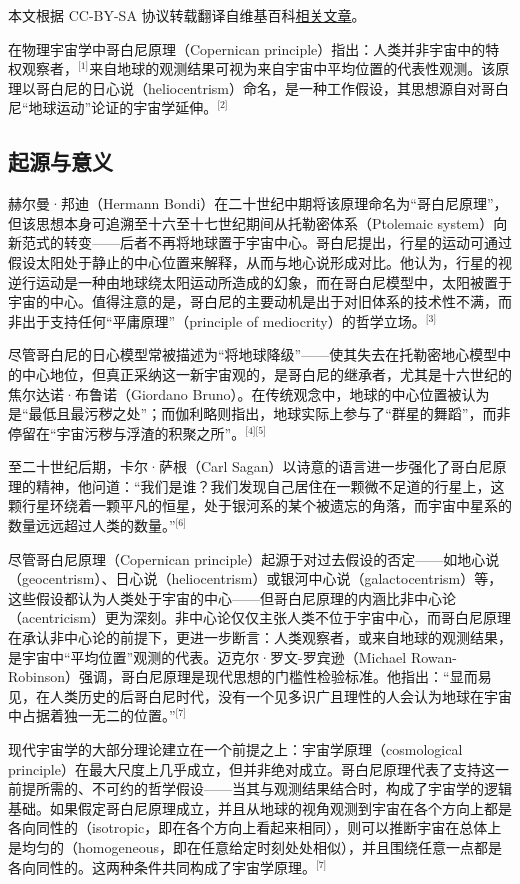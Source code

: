 
本文根据 CC-BY-SA 协议转载翻译自维基百科\href{https://en.wikipedia.org/wiki/Copernican_principle}{相关文章}。

在物理宇宙学中哥白尼原理（Copernican principle）指出：人类并非宇宙中的特权观察者，\(^\text{[1]}\)来自地球的观测结果可视为来自宇宙中平均位置的代表性观测。该原理以哥白尼的日心说（heliocentrism）命名，是一种工作假设，其思想源自对哥白尼“地球运动”论证的宇宙学延伸。\(^\text{[2]}\)
\subsection{起源与意义}
赫尔曼·邦迪（Hermann Bondi）在二十世纪中期将该原理命名为“哥白尼原理”，但该思想本身可追溯至十六至十七世纪期间从托勒密体系（Ptolemaic system）向新范式的转变——后者不再将地球置于宇宙中心。哥白尼提出，行星的运动可通过假设太阳处于静止的中心位置来解释，从而与地心说形成对比。他认为，行星的视逆行运动是一种由地球绕太阳运动所造成的幻象，而在哥白尼模型中，太阳被置于宇宙的中心。值得注意的是，哥白尼的主要动机是出于对旧体系的技术性不满，而非出于支持任何“平庸原理”（principle of mediocrity）的哲学立场。\(^\text{[3]}\)

尽管哥白尼的日心模型常被描述为“将地球降级”——使其失去在托勒密地心模型中的中心地位，但真正采纳这一新宇宙观的，是哥白尼的继承者，尤其是十六世纪的焦尔达诺·布鲁诺（Giordano Bruno）。在传统观念中，地球的中心位置被认为是“最低且最污秽之处”；而伽利略则指出，地球实际上参与了“群星的舞蹈”，而非停留在“宇宙污秽与浮渣的积聚之所”。\(^\text{[4][5]}\)

至二十世纪后期，卡尔·萨根（Carl Sagan）以诗意的语言进一步强化了哥白尼原理的精神，他问道：“我们是谁？我们发现自己居住在一颗微不足道的行星上，这颗行星环绕着一颗平凡的恒星，处于银河系的某个被遗忘的角落，而宇宙中星系的数量远远超过人类的数量。”\(^\text{[6]}\)

尽管哥白尼原理（Copernican principle）起源于对过去假设的否定——如地心说（geocentrism）、日心说（heliocentrism）或银河中心说（galactocentrism）等，这些假设都认为人类处于宇宙的中心——但哥白尼原理的内涵比非中心论（acentricism）更为深刻。非中心论仅仅主张人类不位于宇宙中心，而哥白尼原理在承认非中心论的前提下，更进一步断言：人类观察者，或来自地球的观测结果，是宇宙中“平均位置”观测的代表。迈克尔·罗文-罗宾逊（Michael Rowan-Robinson）强调，哥白尼原理是现代思想的门槛性检验标准。他指出：“显而易见，在人类历史的后哥白尼时代，没有一个见多识广且理性的人会认为地球在宇宙中占据着独一无二的位置。”\(^\text{[7]}\)

现代宇宙学的大部分理论建立在一个前提之上：宇宙学原理（cosmological principle）在最大尺度上几乎成立，但并非绝对成立。哥白尼原理代表了支持这一前提所需的、不可约的哲学假设——当其与观测结果结合时，构成了宇宙学的逻辑基础。如果假定哥白尼原理成立，并且从地球的视角观测到宇宙在各个方向上都是各向同性的（isotropic，即在各个方向上看起来相同），则可以推断宇宙在总体上是均匀的（homogeneous，即在任意给定时刻处处相似），并且围绕任意一点都是各向同性的。这两种条件共同构成了宇宙学原理。\(^\text{[7]}\)

